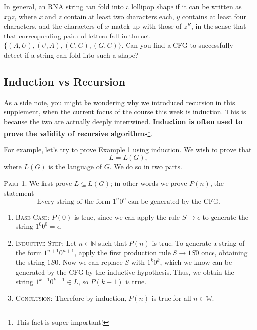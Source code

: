 \documentclass{article}
\begin{document}
        \qquad In general, an RNA string can fold into a lollipop shape if it can be written as $xyz$, where $x$ and $z$ contain at least two characters each, $y$ contains at least four characters, and the characters of $x$ match up with those of $z^{R}$, in the sense that that corresponding pairs of letters fall in the set $\{(A, U), (U, A), (C, G), (G, C)\}$. Can you find a CFG to successfully detect if a string can fold into such a shape?

\subsection*{Induction vs Recursion}
    As a side note, you might be wondering why we introduced recursion in this supplement, when the current focus of the course this week is induction. This is because the two are actually deeply intertwined. \textbf{Induction is often used to prove the validity of recursive algorithms}\footnote{This fact is super important!}.

    \vspace{2mm}
    For example, let's try to prove Example 1 using induction. We wish to prove that $$L = L(G),$$ where $L(G)$ is the language of $G$. We do so in two parts.

    \textsc{Part 1.} We first prove $L \subseteq L(G)$; in other words we prove $P(n)$, the statement $$\text{Every string of the form $1^n0^n$ can be generated by the CFG.}$$
    \begin{enumerate} [label = {}, nosep, leftmargin = .25in]
        \item \textsc{Base Case:} $P(0)$ is true, since we can apply the rule $S \rightarrow \epsilon$ to generate the string $1^{0}0^{0} = \epsilon$.
    
        \vspace{2mm}
        \item \textsc{Inductive Step:} Let $n \in \mathbb{N}$ such that $P(n)$ is true. To generate a string of the form $1^{n+1}0^{n+1}$, apply the first production rule $S \rightarrow 1S0$ once, obtaining the string $1S0$. Now we can replace $S$ with $1^{k}0^{k}$, which we know can be generated by the CFG by the inductive hypothesis. Thus, we obtain the string $1^{k+1}0^{k+1} \in L$, so $P(k + 1)$ is true.
        
        \vspace{2mm}
        \item \textsc{Conclusion:} Therefore by induction, $P(n)$ is true for all $n \in \mathbb{W}$.
    \end{enumerate}
    
\end{document}
